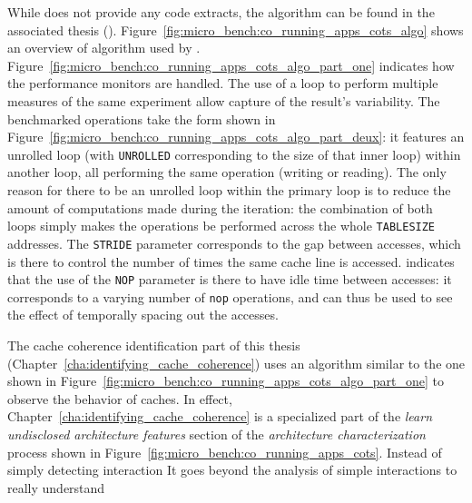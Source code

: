 While \cite{Bin14} does not provide any code extracts, the algorithm can be
found in the associated thesis (\cite{Bin14Thesis}).
Figure~\ref{fig:micro_bench:co_running_apps_cots_algo} shows an overview of
algorithm used by \cite{Bin14}.
Figure~\ref{fig:micro_bench:co_running_apps_cots_algo_part_one} indicates how
the performance monitors are handled. The use of a loop to perform multiple
measures of the same experiment allow capture of the result's variability.
The benchmarked operations take the form shown in
Figure~\ref{fig:micro_bench:co_running_apps_cots_algo_part_deux}: it features an
unrolled loop (with \lstinline!UNROLLED! corresponding to the size of that inner
loop) within another loop, all performing the same operation (writing or
reading). The only reason for there to be an unrolled loop within the primary
loop is to reduce the amount of computations made during the iteration: the
combination of both loops simply makes the operations be performed across
the whole \lstinline!TABLESIZE! addresses. The \lstinline!STRIDE! parameter
corresponds to the gap between accesses, which is there to control the number of
times the same cache line is accessed. \cite{Bin14Thesis} indicates that the
use of the \lstinline!NOP! parameter is there to have idle time between
accesses: it corresponds to a varying number of \lstinline!nop! operations, and
can thus be used to see the effect of temporally spacing out the accesses.

The cache coherence identification part of this thesis
(Chapter~\ref{cha:identifying_cache_coherence}) uses an algorithm similar to the
one shown in Figure~\ref{fig:micro_bench:co_running_apps_cots_algo_part_one} to
observe the behavior of caches. In effect,
Chapter~\ref{cha:identifying_cache_coherence} is a specialized part of the
\textit{learn undisclosed architecture features} section of the
\textit{architecture characterization} process shown in
Figure~\ref{fig:micro_bench:co_running_apps_cots}. Instead of simply detecting
interaction It goes beyond the analysis
of simple interactions to really understand
\stopallthesefloats{}
